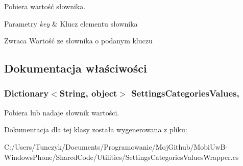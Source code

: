 Pobiera wartość słownika. 


\begin{DoxyParams}{Parametry}
{\em key} & Klucz elementu słownika\\
\hline
\end{DoxyParams}
\begin{DoxyReturn}{Zwraca}
Wartość ze słownika o podanym kluczu
\end{DoxyReturn}


\subsection{Dokumentacja właściwości}
\hypertarget{a00055_a3e34e522b9ad614d28386c66b330cd64}{}
\subsubsection[{Settings\+Categories\+Values}]{\setlength{\rightskip}{0pt plus 5cm}Dictionary$<$String, object$>$ Settings\+Categories\+Values\hspace{0.3cm}{\ttfamily [get]}, {\ttfamily [set]}}\label{a00055_a3e34e522b9ad614d28386c66b330cd64}


Pobiera lub nadaje słownik wartości. 



Dokumentacja dla tej klasy została wygenerowana z pliku\+:\begin{DoxyCompactItemize}
\item 
C\+:/\+Users/\+Tunczyk/\+Documents/\+Programowanie/\+Moj\+Github/\+Mobi\+Uw\+B-\/\+Windows\+Phone/\+Shared\+Code/\+Utilities/Settings\+Categories\+Values\+Wrapper.\+cs\end{DoxyCompactItemize}
